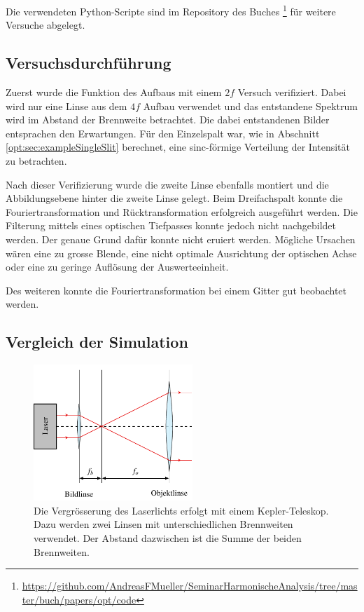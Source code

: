 Die verwendeten Python-Scripte sind im Repository des Buches \footnote{\url{https://github.com/AndreasFMueller/SeminarHarmonischeAnalysis/tree/master/buch/papers/opt/code}} für weitere Versuche abgelegt.

\subsection{Versuchsdurchführung}
Zuerst wurde die Funktion des Aufbaus mit einem $2f$ Versuch verifiziert.
Dabei wird nur eine Linse aus dem $4f$ Aufbau verwendet und das entstandene Spektrum wird im Abstand der Brennweite betrachtet.
Die dabei entstandenen Bilder entsprachen den Erwartungen.
Für den Einzelspalt war, wie in Abschnitt \ref{opt:sec:exampleSingleSlit} berechnet, eine sinc-förmige Verteilung der Intensität zu betrachten.

Nach dieser Verifizierung wurde die zweite Linse ebenfalls montiert und die Abbildungsebene hinter die zweite Linse gelegt.
Beim Dreifachspalt konnte die Fouriertransformation und Rücktransformation erfolgreich ausgeführt werden.
Die Filterung mittels eines optischen Tiefpasses konnte jedoch nicht nachgebildet werden.
Der genaue Grund dafür konnte nicht eruiert werden.
Mögliche Ursachen wären eine zu grosse Blende, eine nicht optimale Ausrichtung der optischen Achse oder eine zu geringe Auflösung der Auswerteeinheit.

Des weiteren konnte die Fouriertransformation bei einem Gitter gut beobachtet werden. 

\subsection{Vergleich der Simulation}

\begin{figure}
    \centering
    \includegraphics[width=60mm]{papers/opt/images/laserAufweiten.pdf}
    \caption{Die Vergrösserung des Laserlichts erfolgt mit einem Kepler-Teleskop.
        Dazu werden zwei Linsen mit unterschiedlichen Brennweiten verwendet.
        Der Abstand dazwischen ist die Summe der beiden Brennweiten.}
    \label{opt:fig:laserAufweiten}
\end{figure}

